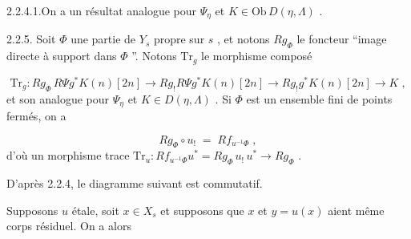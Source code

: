 2.2.4.1.On a un résultat analogue pour $\Psi_\eta$ et $K \in \mathrm{Ob}\, D(\eta,\Lambda)$ .

2.2.5. Soit $\Phi$ une partie de $Y_s$ propre sur $s$ , et notons $Rg_\Phi$ le foncteur ``image directe à support dans $\Phi$ ''. Notons $\mathrm{Tr}_g$ le morphisme composé

\begin{equation}\tag{2.2.5.1}
\mathrm{Tr}_g : Rg_\Phi \, R\Psi g^* K(n)[2n] \to Rg_! R\Psi g^* K(n)[2n] \to Rg_! g^* K(n)[2n] \to K \; ,
\end{equation}
et son analogue pour $\Psi_\eta$ et $K \in D(\eta, \Lambda)$ . Si $\Phi$ est un ensemble fini de points fermés, on a

\begin{equation*}
Rg_\Phi \circ u_! \; = \; Rf_{u^{-1}\Phi} \; ,
\end{equation*}
d'où un morphisme trace $\mathrm{Tr}_u : Rf_{u^{-1}\Phi} u^* = Rg_\Phi \, u_! \, u^* \to Rg_\Phi$ .

D'après 2.2.4, le diagramme suivant est commutatif.

\begin{center}
\end{center}
Supposons $u$ étale, soit $x \in X_s$ et supposons que $x$ et $y = u(x)$ aient même corps résiduel. On a alors

